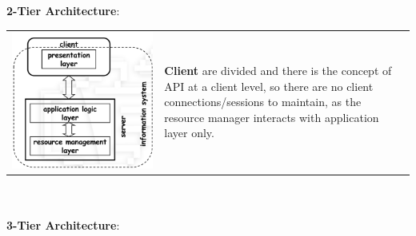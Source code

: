 \documentclass{article}
\begin{document}
\textbf{2-Tier Architecture}:\\
\begin{tabular}{C{4cm}  L{10cm}}
        \includegraphics[scale=0.25]{cattura3.png} &  \newline 
        \textbf{Client} are divided and there is the concept of API at a client level, so there are no client connections/sessions to maintain, as the resource manager interacts with application layer only. \\
\end{tabular}\\\\
\textbf{3-Tier Architecture}:\\
\end{document}
